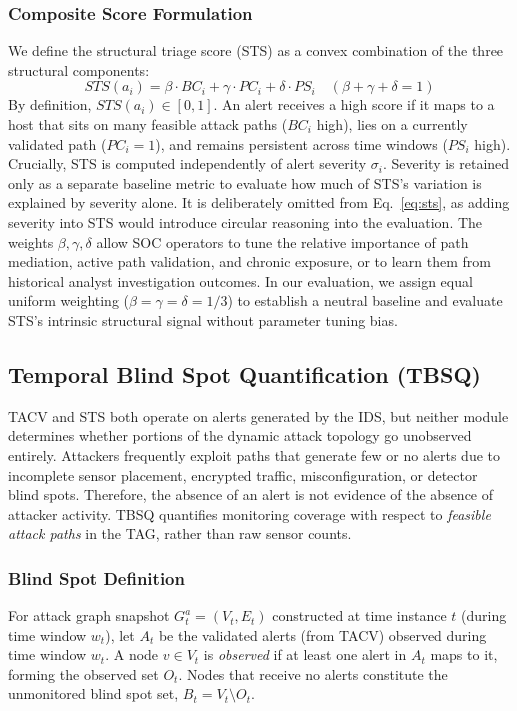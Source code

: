 \documentclass[runningheads]{llncs}
\begin{document}
\subsubsection{Composite Score Formulation}
We define the structural triage score (STS) as a convex combination of the three structural components:
\begin{equation}\label{eq:sts}
STS(a_i) = \beta \cdot BC_i + \gamma \cdot PC_i + \delta \cdot PS_i \quad (\beta + \gamma + \delta = 1)
\end{equation}
By definition, $STS(a_i) \in [0,1]$. An alert receives a high score if it maps to a host that sits on many feasible attack paths ($BC_i$ high), lies on a currently validated path ($PC_i = 1$), and remains persistent across time windows ($PS_i$ high). Crucially, STS is computed independently of alert severity $\sigma_i$. Severity is retained only as a separate baseline metric to evaluate how much of STS's variation is explained by severity alone. It is deliberately omitted from Eq.~\ref{eq:sts}, as adding severity into STS would introduce circular reasoning into the evaluation. The weights $\beta, \gamma, \delta$ allow SOC operators to tune the relative importance of path mediation, active path validation, and chronic exposure, or to learn them from historical analyst investigation outcomes. In our evaluation, we assign equal uniform weighting ($\beta = \gamma = \delta = 1/3$) to establish a neutral baseline and evaluate STS's intrinsic structural signal without parameter tuning bias.

\subsection{Temporal Blind Spot Quantification (TBSQ)}
\label{sec:tbsq}

TACV and STS both operate on alerts generated by the IDS, but neither module determines whether portions of the dynamic attack topology go unobserved entirely. Attackers frequently exploit paths that generate few or no alerts due to incomplete sensor placement, encrypted traffic, misconfiguration, or detector blind spots. Therefore, the absence of an alert is not evidence of the absence of attacker activity. TBSQ quantifies monitoring coverage with respect to \emph{feasible attack paths} in the TAG, rather than raw sensor counts.

\subsubsection{Blind Spot Definition}
For attack graph snapshot $G_t^a = (V_t, E_t)$ constructed at time instance $t$ (during time window $w_t$), let $A_t$ be the validated alerts (from TACV) observed during time window $w_t$. A node $v \in V_t$ is \emph{observed} if at least one alert in $A_t$ maps to it, forming the observed set $O_t$. Nodes that receive no alerts constitute the unmonitored blind spot set, $B_t = V_t \setminus O_t$.
\end{document}
